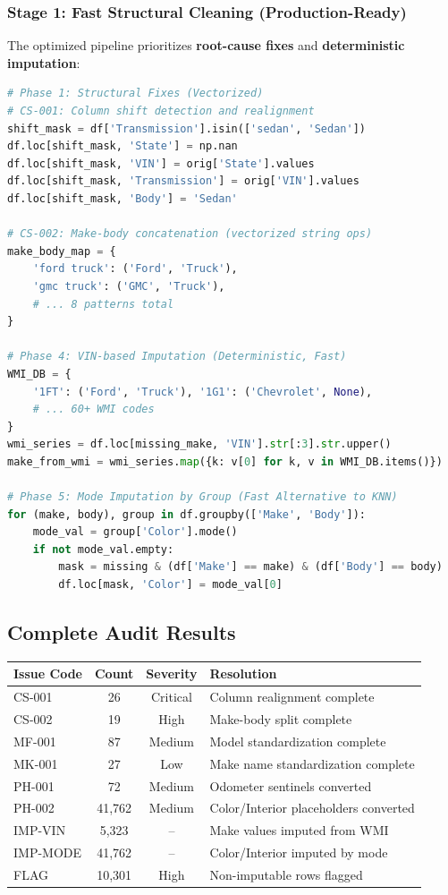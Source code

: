 \documentclass[12pt,a4paper]{article}
\begin{document}
\subsubsection{Stage 1: Fast Structural Cleaning (Production-Ready)}

The optimized pipeline prioritizes \textbf{root-cause fixes} and \textbf{deterministic imputation}:

\begin{lstlisting}[language=Python, caption={Optimized Cleaning Pipeline - Key Components}]
# Phase 1: Structural Fixes (Vectorized)
# CS-001: Column shift detection and realignment
shift_mask = df['Transmission'].isin(['sedan', 'Sedan'])
df.loc[shift_mask, 'State'] = np.nan
df.loc[shift_mask, 'VIN'] = orig['State'].values
df.loc[shift_mask, 'Transmission'] = orig['VIN'].values
df.loc[shift_mask, 'Body'] = 'Sedan'

# CS-002: Make-body concatenation (vectorized string ops)
make_body_map = {
    'ford truck': ('Ford', 'Truck'),
    'gmc truck': ('GMC', 'Truck'),
    # ... 8 patterns total
}

# Phase 4: VIN-based Imputation (Deterministic, Fast)
WMI_DB = {
    '1FT': ('Ford', 'Truck'), '1G1': ('Chevrolet', None),
    # ... 60+ WMI codes
}
wmi_series = df.loc[missing_make, 'VIN'].str[:3].str.upper()
make_from_wmi = wmi_series.map({k: v[0] for k, v in WMI_DB.items()})

# Phase 5: Mode Imputation by Group (Fast Alternative to KNN)
for (make, body), group in df.groupby(['Make', 'Body']):
    mode_val = group['Color'].mode()
    if not mode_val.empty:
        mask = missing & (df['Make'] == make) & (df['Body'] == body)
        df.loc[mask, 'Color'] = mode_val[0]
\end{lstlisting}

\subsection{Complete Audit Results}

\begin{center}
\begin{tabular}{lccl}
\toprule
\textbf{Issue Code} & \textbf{Count} & \textbf{Severity} & \textbf{Resolution} \\
\midrule
CS-001 & 26 & Critical & Column realignment complete \\
CS-002 & 19 & High & Make-body split complete \\
MF-001 & 87 & Medium & Model standardization complete \\
MK-001 & 27 & Low & Make name standardization complete \\
PH-001 & 72 & Medium & Odometer sentinels converted \\
PH-002 & 41,762 & Medium & Color/Interior placeholders converted \\
IMP-VIN & 5,323 & -- & Make values imputed from WMI \\
IMP-MODE & 41,762 & -- & Color/Interior imputed by mode \\
FLAG & 10,301 & High & Non-imputable rows flagged \\
\bottomrule
\end{tabular}
\end{center}
\end{document}
